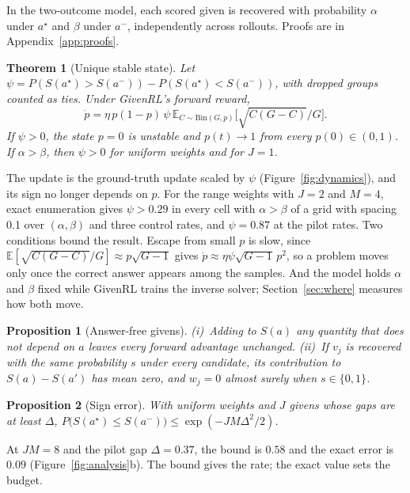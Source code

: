 \documentclass[11pt]{article}
\newtheorem{theorem}{Theorem}
\newtheorem{proposition}{Proposition}
\theoremstyle{remark}
\newcommand{\method}{GivenRL\xspace}
\newcommand{\astar}{a^{\star}}
\newcommand{\aminus}{a^{-}}
\newcommand{\E}{\mathbb{E}}
\begin{document}
In the two-outcome model, each scored given is recovered with probability $\alpha$ under $\astar$ and $\beta$ under $\aminus$, independently across rollouts. Proofs are in Appendix~\ref{app:proofs}.

\begin{theorem}[Unique stable state]
\label{thm:stable}
Let $\psi=P(S(\astar)>S(\aminus))-P(S(\astar)<S(\aminus))$, with dropped groups counted as ties. Under \method's forward reward,
\begin{equation*}
\dot p=\eta\,p(1-p)\,\psi\,\E_{C\sim\mathrm{Bin}(G,p)}\big[\sqrt{C(G-C)}/G\big].
\end{equation*}
If $\psi>0$, the state $p=0$ is unstable and $p(t)\to1$ from every $p(0)\in(0,1)$. If $\alpha>\beta$, then $\psi>0$ for uniform weights and for $J=1$.
\end{theorem}

The update is the ground-truth update scaled by $\psi$ (Figure~\ref{fig:dynamics}), and its sign no longer depends on $p$. For the range weights with $J=2$ and $M=4$, exact enumeration gives $\psi>0.29$ in every cell with $\alpha>\beta$ of a grid with spacing 0.1 over $(\alpha,\beta)$ and three control rates, and $\psi=0.87$ at the pilot rates. Two conditions bound the result. Escape from small $p$ is slow, since $\E[\sqrt{C(G-C)}/G]\approx p\sqrt{G-1}$ gives $\dot p\approx\eta\psi\sqrt{G-1}\,p^2$, so a problem moves only once the correct answer appears among the samples. And the model holds $\alpha$ and $\beta$ fixed while \method trains the inverse solver; Section~\ref{sec:where} measures how both move.

\begin{proposition}[Answer-free givens]
\label{prop:noise}
(i)~Adding to $S(a)$ any quantity that does not depend on $a$ leaves every forward advantage unchanged. (ii)~If $v_j$ is recovered with the same probability $s$ under every candidate, its contribution to $S(a)-S(a')$ has mean zero, and $w_j=0$ almost surely when $s\in\{0,1\}$.
\end{proposition}

\begin{proposition}[Sign error]
\label{prop:sign}
With uniform weights and $J$ givens whose gaps are at least $\Delta$, $P\big(S(\astar)\le S(\aminus)\big)\le\exp(-JM\Delta^2/2)$.
\end{proposition}

At $JM=8$ and the pilot gap $\Delta=0.37$, the bound is $0.58$ and the exact error is $0.09$ (Figure~\ref{fig:analysis}b). The bound gives the rate; the exact value sets the budget.
\end{document}
